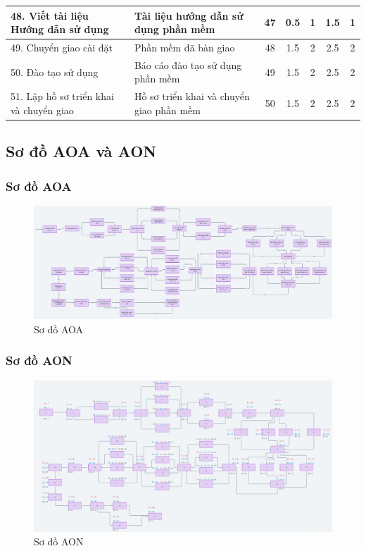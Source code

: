 \begin{longtable}{|p{5cm}|p{5cm}|c|c|c|c|c|}
    48. Viết tài liệu Hướng dẫn sử dụng & Tài liệu hướng dẫn sử dụng phần mềm & 47 & 0.5 & 1 & 1.5 & 1 \\ \hline
    49. Chuyển giao cài đặt & Phần mềm đã bàn giao & 48 & 1.5 & 2 & 2.5 & 2 \\ \hline
    50. Đào tạo sử dụng & Báo cáo đào tạo sử dụng phần mềm & 49 & 1.5 & 2 & 2.5 & 2 \\ \hline
    51. Lập hồ sơ triển khai và chuyển giao & Hồ sơ triển khai và chuyển giao phần mềm & 50 & 1.5 & 2 & 2.5 & 2 \\ \hline
\end{longtable}

\subsection{Sơ đồ AOA và AON}
\subsubsection{Sơ đồ AOA}
\begin{figure}[H]
    \centering
    \includegraphics[width=\textwidth]{images/aoa.png}
    \caption{Sơ đồ AOA}
\end{figure}
\subsubsection{Sơ đồ AON}
\begin{figure}[H]
    \centering
    \includegraphics[width=\textwidth]{images/aon.png}
    \caption{Sơ đồ AON}
\end{figure}
